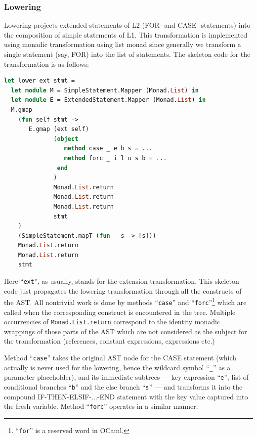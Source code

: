 \subsubsection{Lowering}

Lowering projects extended statements of L2 (FOR- and CASE- statements) into the composition
of simple statements of L1. This transformation is implemented using monadic transformation
using list monad since generally we transform a single statement (say, FOR) into the list
of statements. The skeleton code for the transformation is as follows:

\begin{lstlisting}[language=ocaml]
let lower ext stmt =
  let module M = SimpleStatement.Mapper (Monad.List) in 
  let module E = ExtendedStatement.Mapper (Monad.List) in
  M.gmap 
    (fun self stmt ->
       E.gmap (ext self)
              (object
                 method case _ e b s = ...
                 method forc _ i l u s b = ...
               end
              ) 
              Monad.List.return 
              Monad.List.return 
              Monad.List.return 
              stmt
    )
    (SimpleStatement.mapT (fun _ s -> [s])) 
    Monad.List.return 
    Monad.List.return
    stmt
\end{lstlisting}

Here ``\lstinline{ext}'', as usually, stands for the extension transformation. This skeleton
code just propagates the lowering transformation through all the constructs of the AST. All
nontrivial work is done by methods ``\lstinline{case}'' and 
``\lstinline{forc}''\footnote{``\lstinline{for}'' is a reserved word in OCaml.} which are 
called when the corresponding construct is encountered in the tree. Multiple occurrencies of \lstinline{Monad.List.return}
correspond to the identity monadic wrappings of those parts of the AST which are not 
considered as the subject for the transformation (references, constant expressions, expressions etc.)

Method ``\lstinline{case}'' takes the original AST node for the CASE statement 
(which actually is never used for the lowering, hence the wildcard symbol ``\lstinline{_}'' 
as a parameter placeholder), and its immediate subtrees --- key expression ``\lstinline{e}'',
list of conditional branches ``\lstinline{b}'' and the else branch ``\lstinline{s}'' --- and transforms it 
into the compound \mbox{IF-THEN-ELSIF-...-END} statement with the key value captured into the fresh variable.
Method ``\lstinline{forc}'' operates in a similar manner.

